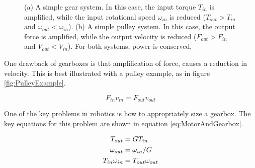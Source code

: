 \begin{figure}[h]		%
\begin{centering}
  \hspace{0.1\textwidth}%
\end{centering}
\caption[Diagram: Force Amplification with Gearbox and Pulley Systems]{(a) A simple gear system. In this case, the input torque $T_{in}$ is amplified, while the input rotational speed $\omega_{in}$ is reduced ($T_{out}>T_{in}$ and $\omega_{out}<\omega_{in}$). (b) A simple pulley system. In this case, the output force is amplified, while the output velocity is reduced ($F_{out}>F_{in}$ and $V_{out}<V_{in}$). For both systems, power is conserved.}
\label{fig:GearboxAndPulleyExample}
\end{figure}
%

One drawback of gearboxes is that amplification of force, causes a reduction in velocity. This is best illustrated with a pulley example, as in figure \ref{fig:PulleyExample}.

\begin{equation}
F_{in}v_{in} = F_{out}v_{out}
\label{eq:PulleyExample}
\end{equation}

One of the key problems in robotics is how to appropriately size a gearbox. The key equations for this problem are shown in equation \ref{eq:MotorAndGearbox}.

\begin{align}
T_{out} &=GT_{in} \notag \\
\omega_{out} &=\omega_{in}/G \notag \\
T_{in}\omega_{in}&=T_{out}\omega_{out}
\label{eq:MotorAndGearbox}
\end{align}

